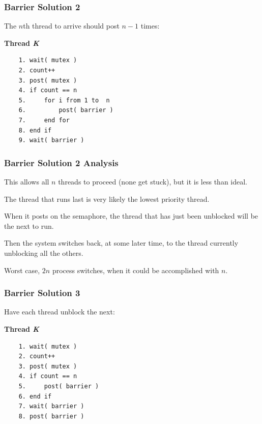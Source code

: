 \begin{frame}[fragile]
	\frametitle{Barrier Solution 2}

	The $n$th thread to arrive should post $n-1$ times:

	\textbf{Thread \textit{K}}\vspace{-6em}
	\begin{verbatim}
	1. wait( mutex )
	2. count++
	3. post( mutex )
	4. if count == n
	5.     for i from 1 to  n
	6.         post( barrier )
	7.     end for
	8. end if
	9. wait( barrier )
  \end{verbatim}
	\vspace{-2em}




\end{frame}

\begin{frame}
	\frametitle{Barrier Solution 2 Analysis}

	This allows all $n$ threads to proceed (none get stuck), but it is less than ideal.

	The thread that runs last is very likely the lowest priority thread.

	When it posts on the semaphore, the thread that has just been unblocked will be the next to run.

	Then the system switches back, at some later time, to the thread currently unblocking all the others.

	Worst case, $2n$ process switches, when it could be accomplished with $n$.


\end{frame}

\begin{frame}[fragile]
	\frametitle{Barrier Solution 3}

	Have each thread unblock the next:

	\textbf{Thread \textit{K}}\vspace{-6em}
	\begin{verbatim}
	1. wait( mutex )
	2. count++
	3. post( mutex )
	4. if count == n
	5.     post( barrier )
	6. end if
	7. wait( barrier )
	8. post( barrier )
  \end{verbatim}
	\vspace{-2em}


\end{frame}


